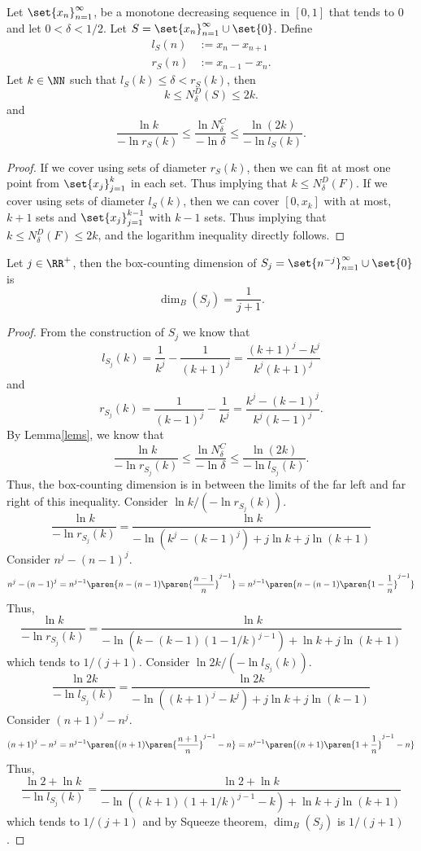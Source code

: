 \begin{lemma}\label{lems}
	Let $\set{x_n}_{n=1}^\infty$, be a monotone decreasing sequence in $[0,1]$ that tends to 0 and let $0 < \delta < 1/2$.
	Let $S=\set{x_n}_{n=1}^\infty\cup\set{0}$.
	Define
	\begin{align*}
		l_S(n)&:= x_n-x_{n+1}\\
		r_S(n)&:= x_{n-1}-x_n.
	\end{align*}
	Let $k\in\NN$ such that $l_S(k)\leq \delta < r_S(k)$, then
	\[
		k \leq N^D_\delta(S)\leq 2k.
	\]
	and
	\[
		\frac{\ln k}{-\ln r_S(k)}\leq \frac{\ln N^C_\delta}{-\ln\delta}\leq\frac{\ln (2k)}{-\ln l_S(k)}.
	\]
\end{lemma}
\begin{proof}
	If we cover using sets of diameter $r_S(k)$, then we can fit at most one point from $\set{x_j}_{j=1}^k$ in each set.
	Thus implying that $k\leq N^D_\delta(F)$.
	If we cover using sets of diameter $l_S(k)$, then we can cover $[0,x_k]$ with at most, $k+1$ sets and $\set{x_j}_{j=1}^{k-1}$ with $k-1$ sets.
	Thus implying that $k\leq N^D_\delta(F)\leq 2k$, and the logarithm inequality directly follows.
\end{proof}

\begin{example}
	Let $j\in\RR^+$, then the box-counting dimension of $S_j=\set{n^{-j}}_{n=1}^\infty\cup\set{0}$ is
	\[
		\dim_B(S_j)=\frac{1}{j+1}.
	\]
\end{example}
\begin{proof}
	From the construction of $S_j$ we know that
	\[
		l_{S_j}(k) = \frac{1}{k^j}-\frac{1}{{(k+1)}^j} = \frac{{(k+1)}^j-k^j}{k^j{(k+1)}^j}
	\]
	and
	\[
		r_{S_j}(k) = \frac{1}{{(k-1)}^j}-\frac{1}{k^j} = \frac{k^j-{(k-1)}^j}{k^j{(k-1)}^j}.
	\]
	By Lemma\autoref{lems}, we know that
	\[
		\frac{\ln k}{-\ln r_{S_j}(k)}\leq \frac{\ln N^C_\delta}{-\ln\delta}\leq\frac{\ln (2k)}{-\ln l_{S_j}(k)}.
	\]
	Thus, the box-counting dimension is in between the limits of the far left and far right of this inequality.
	Consider $\ln k/(-\ln r_{S_j}(k))$.
	\[
		\frac{\ln k}{-\ln r_{S_j}(k)}=\frac{\ln k}{-\ln (k^j-{(k-1)}^j)+j\ln k +j\ln(k+1)}
	\]
	Consider $n^j-{(n-1)}^j$.
	\[
		n^j-{(n-1)}^j=n^{j-1}\paren{ n - (n-1)\paren{\frac{n-1}{n}}^{j-1} }=n^{j-1}\paren{ n - (n-1)\paren{1-\frac{1}{n}}^{j-1} }
	\]
	Thus,
	\[
		\frac{\ln k}{-\ln r_{S_j}(k)}=\frac{\ln k}{-\ln(k-(k-1){(1-1/k)}^{j-1})+\ln k +j\ln(k+1)}
	\]
	which tends to $1/(j+1)$.
	Consider $\ln 2k/(-\ln l_{S_j}(k))$.
	\[
		\frac{\ln 2k}{-\ln l_{S_j}(k)}=\frac{\ln 2k}{-\ln ({(k+1)}^j-k^j)+j\ln k +j\ln(k-1)}
	\]
	Consider ${(n+1)}^j-n^j$.
	\[
		{(n+1)}^j-n^j=n^{j-1}\paren{ (n+1)\paren{\frac{n+1}{n}}^{j-1} - n }=n^{j-1}\paren{ (n+1)\paren{1+\frac{1}{n}}^{j-1} - n }
	\]
	Thus,
	\[
		\frac{\ln 2 +\ln k}{-\ln l_{S_j}(k)}=\frac{\ln 2+\ln k}{-\ln((k+1){(1+1/k)}^{j-1}-k)+\ln k +j\ln(k+1)}
	\]
	which tends to $1/(j+1)$ and by Squeeze theorem, $\dim_B(S_j)$ is $1/(j+1)$.
\end{proof}

